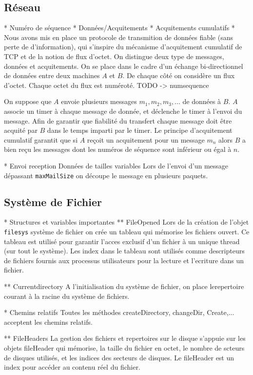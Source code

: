 \documentclass[11pt]{article}
\begin{document}
\subsection{Réseau}
* Numéro de séquence
* Données/Acquitements
* Acquitements cumulatifs
* 
Nous avons mis en place un protocole de transmition de données fiable (sans perte de d'information), qui s'inspire du mécanisme d'acquitement cumulatif de TCP et de la notion de flux d'octet. 
On distingue deux type de messages, données et acquitements. On se place dans le cadre d'un échange bi-directionnel de données entre deux machines $A$ et $B$.
De chaque côté on considère un flux d'octet. Chaque octet du flux est numéroté. TODO -> numsequence

On suppose que $A$ envoie plusieurs messages $m_1, m_2, m_3, ... $ de données à $B$.
$A$ associe un timer à chaque message de donnée, et déclenche le timer à l'envoi du message.
Afin de garantir que fiabilité du transfert chaque message doit être acquité par $B$ dans le temps imparti par le timer. Le principe d'acquitement cumulatif garantit que si $A$ reçoit un acquitement pour un message $m_n$ alors $B$ a bien reçu les messages dont les numéros de séquence sont inférieur ou égal à $n$.

* Envoi reception Données de tailles variables
Lors de l'envoi d'un message dépassant \texttt{maxMailSize} on découpe le message en plusieurs paquets.

\subsection{Système de Fichier}

* Structures et variables importantes 
** FileOpened 
Lors de la création de l'objet \texttt{filesys} système de fichier on crée un tableau qui mémorise les fichiers ouvert. Ce tableau est utilisé pour garantir l'acces exclusif d'un fichier à un unique thread (sur tout le système). Les index dans le tableau sont utilisés comme descripteurs de fichiers fournis aux processus utilisateurs pour la lecture et l'ecriture dans un fichier.


** Currentdirectory
A l'initialisation du système de fichier, on place lerepertoire courant à la racine du système de fichiers.

* Chemins relatifs
Toutes les méthodes createDirectory, changeDir, Create,... acceptent les chemins relatifs.

** FileHeaders
La gestion des fichiers et repertoires sur le disque s'appuie sur les objets fileHeader qui mémorise,
la taille du fichier en octet, le nombre de scteurs de disques utilisés, et les indices des secteurs de disques.
Le fileHeader est un index pour accéder au contenu réel du fichier.
\end{document}
